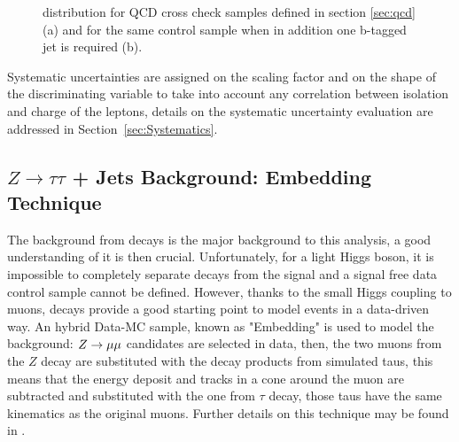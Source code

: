 \begin{figure}[tp]
	\begin{center}
	     
	
	\end{center}
	\caption{\mmc distribution for QCD cross check samples defined in section \ref{sec:qcd} (a) and for the same control sample when in addition one b-tagged jet is required (b). }
	\label{fig:ABCD_cr}
\end{figure}


Systematic uncertainties are assigned on the scaling factor \rqcd and on the shape of
the discriminating variable \mmc to take into account any correlation between isolation and charge 
of the leptons, details on the systematic uncertainty evaluation are addressed in Section~\ref{sec:Systematics}.





\subsection{$Z \rightarrow \tau\tau$ + Jets Background: Embedding Technique}\label{sec:ztau}
The background from \Ztautau decays is the major background to this analysis, a good understanding 
of it is then crucial.
 Unfortunately, for a light Higgs boson, it is impossible to completely separate \Ztautau decays 
from the signal and a signal free data control sample cannot be defined.
However, thanks to the small Higgs coupling to muons, \Zmumu decays provide a good starting point to 
model \Ztautau events in a data-driven way. An hybrid Data-MC sample, known as "Embedding" is used to model the \Ztautau background: 
$Z\rightarrow \mu\mu$ candidates are selected in data, then, the two muons from the $Z$ decay are substituted with the decay 
products from simulated taus, this means that the energy deposit and tracks in a cone around the muon are subtracted
and substituted with the one from $\tau$ decay, those taus have the same kinematics as the original muons. 
Further details on this technique may be found in \cite{Embedding, SMold}.

